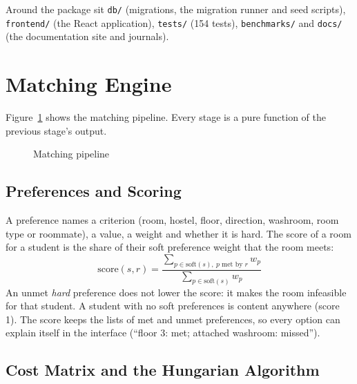 Around the package sit \texttt{db/} (migrations, the migration runner and
seed scripts), \texttt{frontend/} (the React application),
\texttt{tests/} (154 tests), \texttt{benchmarks/} and \texttt{docs/}
(the documentation site and journals).

\section{Matching Engine}

Figure~\ref{fig:pipeline} shows the matching pipeline. Every stage is a
pure function of the previous stage's output.

\begin{figure}[H]
\centering
{}
\caption{Matching pipeline}
\label{fig:pipeline}
\end{figure}

\subsection{Preferences and Scoring}

A preference names a criterion (room, hostel, floor, direction,
washroom, room type or roommate), a value, a weight and whether it is
hard. The score of a room for a student is the share of their soft
preference weight that the room meets:
\[
  \mathrm{score}(s, r) = \frac{\sum_{p \in \mathrm{soft}(s),\ p \text{ met by } r} w_p}
                              {\sum_{p \in \mathrm{soft}(s)} w_p}
\]
An unmet \emph{hard} preference does not lower the score: it makes the
room infeasible for that student. A student with no soft preferences is
content anywhere (score 1). The score keeps the lists of met and unmet
preferences, so every option can explain itself in the interface
(``floor 3: met; attached washroom: missed'').

\subsection{Cost Matrix and the Hungarian Algorithm}

